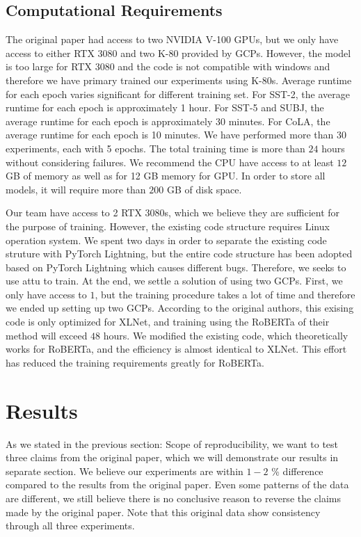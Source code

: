 \documentclass{article}
\begin{document}
\subsection{Computational Requirements}

The original paper had access to two NVIDIA V-100 GPUs, but we only have access to either 
RTX 3080 and two K-80 provided by GCPs. However, the model is too large for RTX 3080 and the code 
is not compatible with windows and therefore we have primary trained our experiments using K-80s.
Average runtime for each epoch varies significant for different training set. For SST-2, 
the average runtime for each epoch is approximately 1 hour. For SST-5 and SUBJ, the average runtime 
for each epoch is approximately 30 minutes. For CoLA, the average runtime for each epoch is 10 minutes.
We have performed more than 30 experiments, each with 5 epochs. The total training time is more than 
$24$ hours without considering failures. We recommend the CPU have access to at least $12$ GB of memory as well 
as for 12 GB memory for GPU. In order to store all models, it will require more than $200$ GB of disk 
space.

Our team have access to 2 RTX 3080s, which we believe they are sufficient for the purpose of training. 
However, the existing code structure requires Linux operation system. We spent two days in order to 
separate the existing code struture with PyTorch Lightning, but the entire code structure has been adopted 
based on PyTorch Lightning which causes different bugs. Therefore, we seeks to use attu to train. At the 
end, we settle a solution of using two GCPs. First, we only have access to $1$, but the training procedure 
takes a lot of time and therefore we ended up setting up two GCPs. According to the original authors,
this exising code is only optimized for XLNet, and training using the RoBERTa of their method will exceed
$48$ hours. We modified the existing code, which theoretically works for RoBERTa, and the efficiency is 
almost identical to XLNet. This effort has reduced the training requirements greatly for RoBERTa.

\section{Results}

As we stated in the previous section: Scope of reproducibility, we want to test three claims 
from the original paper, which we will demonstrate our results in separate section. We believe 
our experiments are within $1-2$ \% difference compared to the results from the original paper.
Even some patterns of the data are different, we still believe there is no conclusive reason 
to reverse the claims made by the original paper. Note that this original data show 
consistency through all three experiments.
\end{document}
